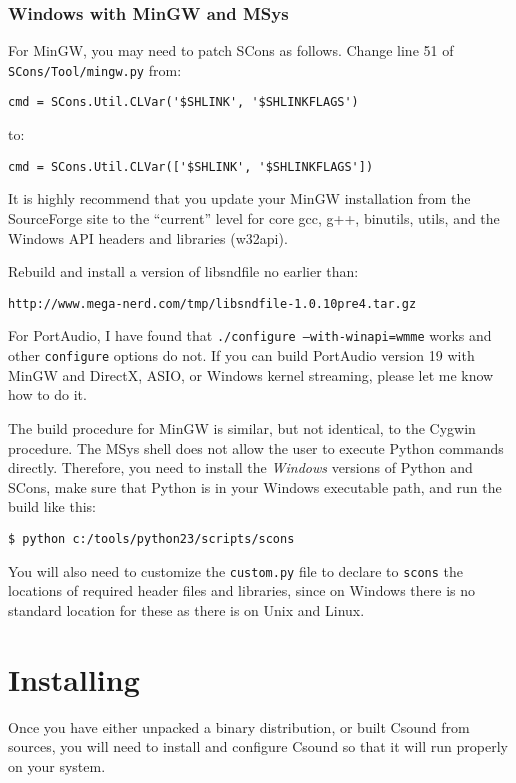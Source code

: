 \documentclass[10pt,letterpaper,onecolumn]{ltxguide}
\begin{document}
\subsubsection{Windows with MinGW and MSys}

For MinGW, you may need to patch SCons as follows. Change line 51 of \texttt{SCons/Tool/mingw.py} from:
\begin{verbatim}
cmd = SCons.Util.CLVar('$SHLINK', '$SHLINKFLAGS')
\end{verbatim}
to:
\begin{verbatim}
cmd = SCons.Util.CLVar(['$SHLINK', '$SHLINKFLAGS']) 
\end{verbatim}

It is highly recommend that you update your MinGW installation from the SourceForge site to the ``current'' level for core gcc, g++, binutils,  utils, and the Windows API headers and libraries (w32api).

Rebuild and install a version of libsndfile no earlier than:
\begin{verbatim}
http://www.mega-nerd.com/tmp/libsndfile-1.0.10pre4.tar.gz
\end{verbatim}

For PortAudio, I have found that \texttt{./configure ---with-winapi=wmme} works and other \texttt{configure} options do not. If you can build PortAudio version 19 with MinGW and DirectX, ASIO, or Windows kernel streaming, please let me know how to do it.

The build procedure for MinGW is similar, but not identical, to the Cygwin procedure. The MSys shell does not allow the user to execute Python commands directly. Therefore, you need to install the \emph{Windows} versions of Python and SCons, make sure that Python is in your Windows executable path, and run the build like this:
\begin{verbatim}
$ python c:/tools/python23/scripts/scons
\end{verbatim}

You will also need to customize the \texttt{custom.py} file to declare to \texttt{scons} the locations of required header files and libraries, since on Windows there is no standard location for these as there is on Unix and Linux.

\section{Installing}

Once you have either unpacked a binary distribution, or built Csound from sources, you will need to install and configure Csound so that it will run properly on your system. 
\end{document}
